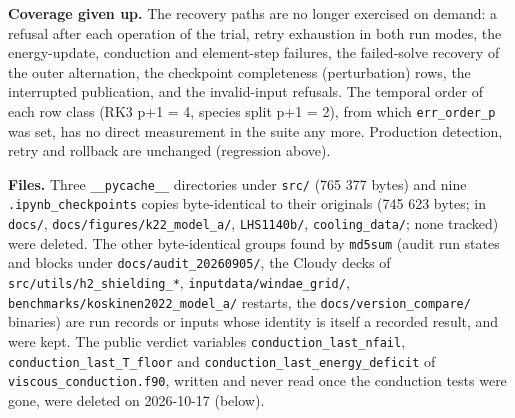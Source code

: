 \documentclass[english,a4paper]{my_memo}
\begin{document}
\textbf{Coverage given up.} The recovery paths are no longer exercised on demand: a refusal after each operation of the trial, retry exhaustion in both run modes, the energy-update, conduction and element-step failures, the failed-solve recovery of the outer alternation, the checkpoint completeness (perturbation) rows, the interrupted publication, and the invalid-input refusals. The temporal order of each row class (RK3 p+1 = 4, species split p+1 = 2), from which \texttt{err\_order\_p} was set, has no direct measurement in the suite any more. Production detection, retry and rollback are unchanged (regression above).

\textbf{Files.} Three \texttt{\_\_pycache\_\_} directories under \texttt{src/} (765 377 bytes) and nine \texttt{.ipynb\_checkpoints} copies byte-identical to their originals (745 623 bytes; in \texttt{docs/}, \texttt{docs/figures/k22\_model\_a/}, \texttt{LHS1140b/}, \texttt{cooling\_data/}; none tracked) were deleted. The other byte-identical groups found by \texttt{md5sum} (audit run states and blocks under \texttt{docs/audit\_20260905/}, the Cloudy decks of \texttt{src/utils/h2\_shielding\_*}, \texttt{inputdata/windae\_grid/}, \texttt{benchmarks/koskinen2022\_model\_a/} restarts, the \texttt{docs/version\_compare/} binaries) are run records or inputs whose identity is itself a recorded result, and were kept. The public verdict variables \texttt{conduction\_last\_nfail}, \texttt{conduction\_last\_T\_floor} and \texttt{conduction\_last\_energy\_deficit} of \texttt{viscous\_conduction.f90}, written and never read once the conduction tests were gone, were deleted on 2026-10-17 (below).
\end{document}
